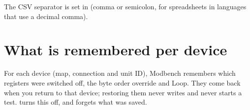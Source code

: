 The CSV separator is set in  (comma or semicolon, for
spreadsheets in languages that use a decimal comma).

\section{What is remembered per device}

For each device (map, connection and unit ID), Modbench remembers which
registers were switched off, the byte order override and Loop. They come back
when you return to that device; restoring them never writes and never starts
a test.  turns this off, and forgets what was
saved.
